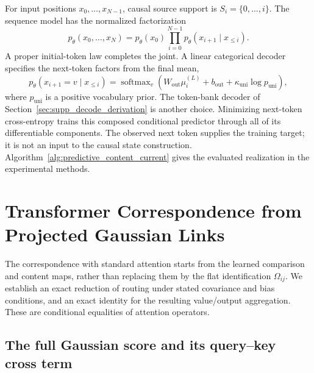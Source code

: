 \documentclass[twoside,11pt]{article}
\begin{document}
For input positions \(x_0,\ldots,x_{N-1}\), causal source support is \(S_i=\{0,\ldots,i\}\). The sequence model has the normalized factorization
\begin{equation}
p_\theta(x_0,\ldots,x_N)
=p_\theta(x_0)\prod_{i=0}^{N-1}p_\theta(x_{i+1}\mid x_{\le i}).
\label{eq:next_token_factorization_v2}
\end{equation}
A proper initial-token law completes the joint. A linear categorical decoder specifies the next-token factors from the final mean,
\begin{equation}
p_\theta(x_{i+1}=v\mid x_{\le i})
=\operatorname{softmax}_v\left(
W_{\mathrm{out}}\mu_i^{(L)}+b_{\mathrm{out}}
+\kappa_{\mathrm{uni}}\log p_{\mathrm{uni}}\right),
\label{eq:predictive_linear_decoder}
\end{equation}
where \(p_{\mathrm{uni}}\) is a positive vocabulary prior. The token-bank decoder of Section~\ref{sec:supp_decode_derivation} is another choice. Minimizing next-token cross-entropy trains this composed conditional predictor through all of its differentiable components. The observed next token supplies the training target; it is not an input to the causal state construction. Algorithm~\ref{alg:predictive_content_current} gives the evaluated realization in the experimental methods.

\FloatBarrier
\section{Transformer Correspondence from Projected Gaussian Links}
\label{sec:transformer_comparison_summary}
\label{sec:transformer_limit}

The correspondence with standard attention starts from the learned comparison and content maps, rather than replacing them by the flat identification $\Omega_{ij}$. We establish an exact reduction of routing under stated covariance and bias conditions, and an exact identity for the resulting value/output aggregation. These are conditional equalities of attention operators. 

\subsection{The full Gaussian score and its query--key cross term}
\label{sec:dot_product_derivation}
\end{document}
